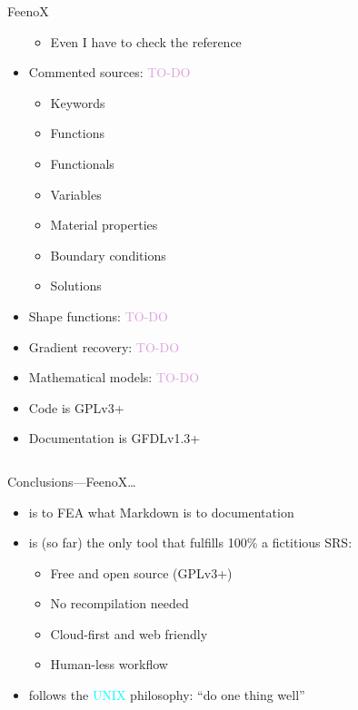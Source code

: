 \documentclass[
  ignorenonframetext,
  aspectratio=169,
]{beamer}
\providecommand{\tightlist}{%
  \setlength{\itemsep}{0pt}\setlength{\parskip}{0pt}}
\begin{document}
\begin{frame}{}
\begin{columns}[T]
\begin{column}{0.5\textwidth}
\begin{exampleblock}{FeenoX}
\begin{itemize}
  \begin{itemize}
  \tightlist
  \item
    Even I have to check the reference
  \end{itemize}
\item
  Commented sources: \textcolor{Plum}{TO-DO}

  \begin{itemize}
  \tightlist
  \item
    Keywords
  \item
    Functions
  \item
    Functionals
  \item
    Variables
  \item
    Material properties
  \item
    Boundary conditions
  \item
    Solutions
  \end{itemize}
\item
  Shape functions: \textcolor{Plum}{TO-DO}
\item
  Gradient recovery: \textcolor{Plum}{TO-DO}
\item
  Mathematical models: \textcolor{Plum}{TO-DO}
\end{itemize}

\medskip

\begin{itemize}
\tightlist
\item
  Code is GPLv3+
\item
  Documentation is GFDLv1.3+
\end{itemize}
\end{exampleblock}
\end{column}
\end{columns}
\end{frame}

\begin{frame}{Conclusions---FeenoX\ldots{}}
\protect\hypertarget{conclusionsfeenox}{}
\begin{itemize}
\tightlist
\item
  is to FEA what Markdown is to documentation
\item
  is (so far) the only tool that fulfills 100\% a fictitious SRS:

  \begin{itemize}
  \tightlist
  \item
    Free and open source (GPLv3+)
  \item
    No recompilation needed
  \item
    Cloud-first and web friendly
  \item
    Human-less workflow
  \end{itemize}
\item
  follows the {\textcolor{cyan}{UNIX}} philosophy: ``do one thing well''
\end{itemize}
\end{frame}
\end{document}
